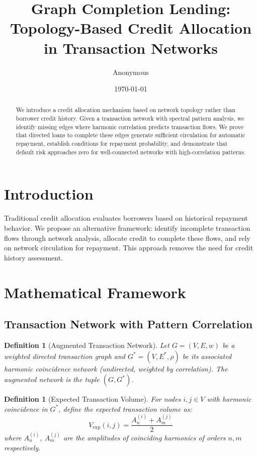 \documentclass[12pt]{article}
\title{Graph Completion Lending: \\
Topology-Based Credit Allocation in Transaction Networks}
\author{Anonymous}
\date{\today}
\newtheorem{definition}[theorem]{Definition}
\begin{document}
\maketitle

\begin{abstract}
We introduce a credit allocation mechanism based on network topology rather than borrower credit history. Given a transaction network with spectral pattern analysis, we identify missing edges where harmonic correlation predicts transaction flows. We prove that directed loans to complete these edges generate sufficient circulation for automatic repayment, establish conditions for repayment probability, and demonstrate that default risk approaches zero for well-connected networks with high-correlation patterns.
\end{abstract}

\section{Introduction}

Traditional credit allocation evaluates borrowers based on historical repayment behavior. We propose an alternative framework: identify incomplete transaction flows through network analysis, allocate credit to complete these flows, and rely on network circulation for repayment. This approach removes the need for credit history assessment.

\section{Mathematical Framework}

\subsection{Transaction Network with Pattern Correlation}

\begin{definition}[Augmented Transaction Network]
Let $G = (V, E, w)$ be a weighted directed transaction graph and $G^* = (V, E^*, \rho)$ be its associated harmonic coincidence network (undirected, weighted by correlation). The augmented network is the tuple $(G, G^*)$.
\end{definition}

\begin{definition}[Expected Transaction Volume]
For nodes $i,j \in V$ with harmonic coincidence in $G^*$, define the expected transaction volume as:
$$
V_{\text{exp}}(i,j) = \frac{A_n^{(i)} + A_m^{(j)}}{2}
$$
where $A_n^{(i)}$, $A_m^{(j)}$ are the amplitudes of coinciding harmonics of orders $n,m$ respectively.
\end{definition}
\end{document}
